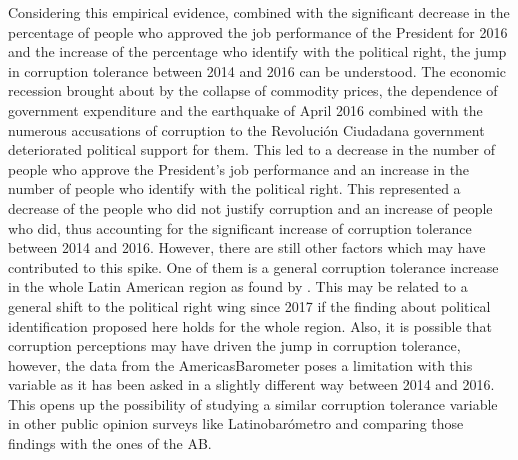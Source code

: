 \documentclass[floatsintext,man]{apa7}\usepackage[]{graphicx}\usepackage[]{color}
\begin{document}
Considering this empirical evidence, combined with the significant decrease in the percentage of people who approved the job performance of the President for 2016 and the increase of the percentage who identify with the political right, the jump in corruption tolerance between 2014 and 2016 can be understood. The economic recession brought about by the collapse of commodity prices, the dependence of government expenditure and the earthquake of April 2016 combined with the numerous accusations of corruption to the Revolución Ciudadana government deteriorated political support for them. This led to a decrease in the number of people who approve the President's job performance and an increase in the number of people who identify with the political right. This represented a decrease of the people who did not justify corruption and an increase of people who did, thus accounting for the significant increase of corruption tolerance between 2014 and 2016. However, there are still other factors which may have contributed to this spike. One of them is a general corruption tolerance increase in the whole Latin American region as found by \textcite{Lupu.2017}. This may be related to a general shift to the political right wing since 2017 \textcite{Melendez.2017} if the finding about political identification proposed here holds for the whole region. Also, it is possible that corruption perceptions may have driven the jump in corruption tolerance, however, the data from the AmericasBarometer poses a limitation with this variable as it has been asked in a slightly different way between 2014 and 2016. This opens up the possibility of studying a similar corruption tolerance variable in other public opinion surveys like Latinobarómetro and comparing those findings with the ones of the AB. 
\end{document}

